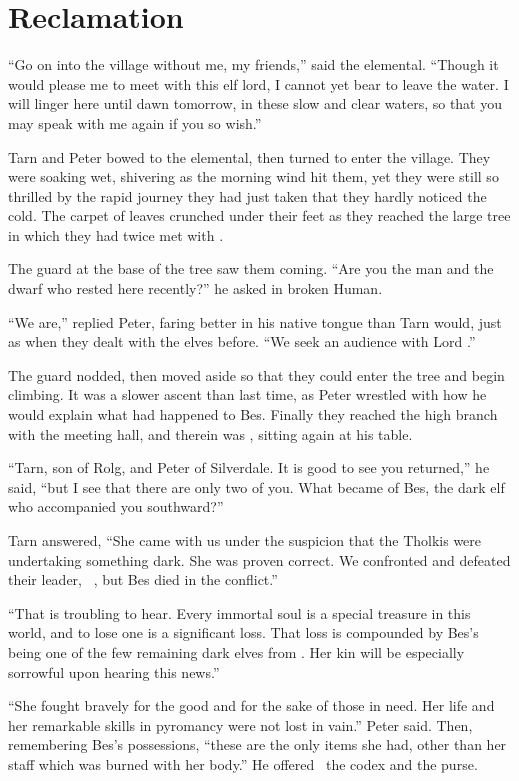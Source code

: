 \chapter{Reclamation}
``Go on into the village without me, my friends,'' said the elemental.  ``Though it would please me to meet with this elf lord, I cannot yet bear to leave the water.  I will linger here until dawn tomorrow, in these slow and clear waters, so that you may speak with me again if you so wish.''

Tarn and Peter bowed to the elemental, then turned to enter the village.   They were soaking wet, shivering as the morning wind hit them, yet they were still so thrilled by the rapid journey they had just taken that they hardly noticed the cold.  The carpet of leaves crunched under their feet as they reached the large tree in which they had twice met with \arilor.

The guard at the base of the tree saw them coming.  ``Are you the man and the dwarf who rested here recently?'' he asked in broken Human.

``We are,'' replied Peter, faring better in his native tongue than Tarn would, just as when they dealt with the elves before.  ``We seek an audience with Lord \arilor.''

The guard nodded, then moved aside so that they could enter the tree and begin climbing.  It was a slower ascent than last time, as Peter wrestled with how he would explain what had happened to Bes.  Finally they reached the high branch with the meeting hall, and therein was \arilor, sitting again at his table.

``Tarn, son of Rolg, and Peter of Silverdale.  It is good to see you returned,'' he said, ``but I see that there are only two of you.  What became of Bes, the dark elf who accompanied you southward?''

Tarn answered, ``She came with us under the suspicion that the Tholkis were undertaking something dark.  She was proven correct.  We confronted and defeated their leader, \mothzam\ \driktur, but Bes died in the conflict.''

``That is troubling to hear.  Every immortal soul is a special treasure in this world, and to lose one is a significant loss.  That loss is compounded by Bes's being one of the few remaining dark elves from \yedmurdim.  Her kin will be especially sorrowful upon hearing this news.''

``She fought bravely for the good and for the sake of those in need.  Her life and her remarkable skills in pyromancy were not lost in vain.'' Peter said.  Then, remembering Bes's possessions, ``these are the only items she had, other than her staff which was burned with her body.''  He offered \arilor\ the codex and the purse.

